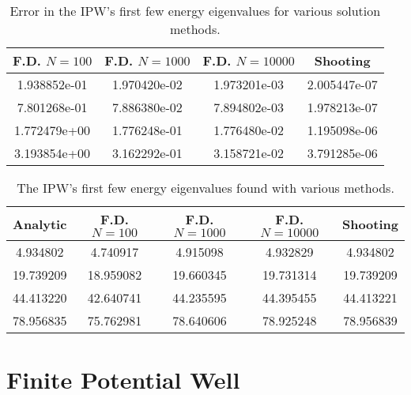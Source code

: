 \documentclass[11pt, a4paper]{article}
\begin{document}
\clearpage %

\begin{table}[H]
\centering

\begin{tabular}{c|c|c|c}
     F.D. $ N = 100 $ &   F.D. $ N = 1000 $ &   F.D. $ N = 10000 $ &  Shooting \\
    \hline
    1.938852e-01 & 1.970420e-02 & 1.973201e-03 & 2.005447e-07\\
    7.801268e-01 & 7.886380e-02 & 7.894802e-03 & 1.978213e-07\\
    1.772479e+00 & 1.776248e-01 & 1.776480e-02 & 1.195098e-06\\
    3.193854e+00 & 3.162292e-01 & 3.158721e-02 & 3.791285e-06
\end{tabular}
\caption{Error in the IPW's first few energy eigenvalues for various solution methods.}
\end{table}

\begin{table}[H]
\centering

\begin{tabular}{c|c|c|c|c}
     Analytic &  F.D. $ N = 100 $ &   F.D. $ N = 1000 $ &   F.D. $ N = 10000 $ &  Shooting \\
    \hline
    4.934802 & 4.740917 & 4.915098 & 4.932829 & 4.934802\\
    19.739209 & 18.959082 & 19.660345 & 19.731314 & 19.739209\\
    44.413220 & 42.640741 & 44.235595 & 44.395455 & 44.413221\\
    78.956835 & 75.762981 & 78.640606 & 78.925248 & 78.956839
\end{tabular}
\caption{The IPW's first few energy eigenvalues found with various methods. }
\label{bvp:table:ipw-energy}

\end{table}



\section{Finite Potential Well}
\end{document}
